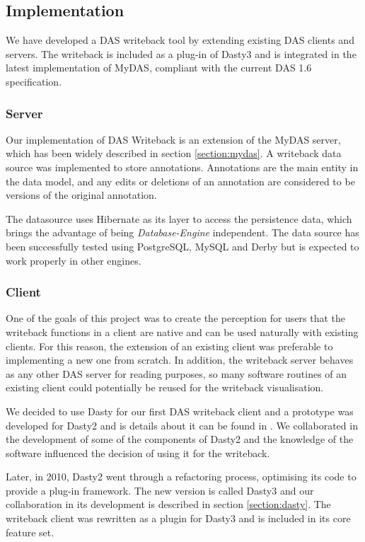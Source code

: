 \subsection{Implementation}
We have developed a DAS writeback tool by extending existing DAS clients and servers. The writeback is included as a plug-in of Dasty3 and is integrated in the latest implementation of MyDAS, compliant with the current DAS 1.6 specification. 

\subsubsection{Server}
Our implementation of DAS Writeback is an extension of the MyDAS server, which has been widely described in section \ref{section:mydas}. A writeback data source was implemented to store annotations. Annotations are the main entity in the data model, and any edits or deletions of an annotation are considered to be versions of the original annotation.

The datasource uses Hibernate \cite{BAU2006} as its layer to access the persistence data, which brings the advantage of being \emph{Database-Engine} independent. The data source has been successfully tested using PostgreSQL, MySQL and Derby but is expected to work properly in other engines.

\subsubsection{Client}
One of the goals of this project was to create the perception for users that the writeback functions in a client are native and can be used naturally with existing clients. For this reason, the extension of an existing client was preferable to implementing a new one from scratch. In addition, the writeback server behaves as any other DAS server for reading purposes, so many software routines of an existing client could potentially be reused for the writeback visualisation.

We decided to use Dasty for our first DAS writeback client and a prototype was developed for Dasty2 and is details about it can be found in \cite{SAL2010}. We collaborated in the development of some of the components of Dasty2 \cite{JIM2008} and the knowledge of the software influenced the decision of using it for the writeback.

Later, in 2010, Dasty2 went through a refactoring process, optimising its code to provide a plug-in framework. The new version is called Dasty3 and our collaboration in its development is described in section \ref{section:dasty}. The writeback client was rewritten as a plugin for Dasty3 and is included in its core feature set.

